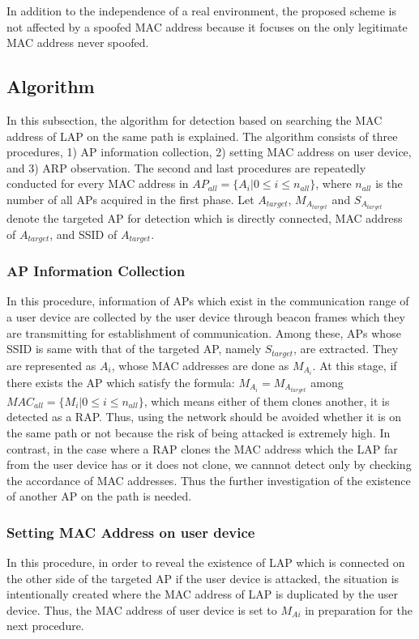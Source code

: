 \documentclass[conference]{IEEEtran}
\begin{document}
In addition to the independence of a real environment, the proposed scheme is not affected by a spoofed MAC address because it focuses on the only legitimate MAC address never spoofed.

\subsection{Algorithm}
In this subsection, the algorithm for detection based on searching the MAC address of LAP on the same path is explained.
The algorithm consists of three procedures, 1) AP information collection, 2) setting MAC address on user device, and 3) ARP observation.
The second and last procedures are repeatedly conducted for every MAC address in  $AP_{all}=\{A_i|0\le i \le n_{all}\}$, where $n_{all}$ is the number of all APs acquired in the first   phase.
Let $A_{target}$, $M_{A_{target}}$ and $S_{A_{target}}$ denote the targeted AP for detection which is directly connected, MAC address of $A_{target}$, and SSID of $A_{target}$.

\subsubsection{AP Information Collection}
In this procedure, information of APs which exist in the communication range of a user device are collected by the user device through beacon frames which they are transmitting for establishment of communication.
Among these, APs whose SSID is same with that of the targeted AP, namely $S_{target}$, are extracted.
They are represented as $A_i$, whose MAC addresses are done as $M_{A_i}$.
At this stage, if there exists the AP which satisfy the formula: $M_{A_i} = M_{A_{target}}$  among $MAC_{all}=\{M_i|0 \le i \le n_{all}\}$, which means either of them clones another, it is detected as a RAP.
Thus, using the network should be avoided whether it is on the same path or not because the risk of being attacked is extremely high. 
In contrast, in the case where a RAP clones the MAC address which the LAP far from the user device has or it does not clone, we cannnot detect only by checking the accordance of MAC addresses.
Thus the further investigation of the existence of another AP on the path is needed.

\subsubsection{Setting MAC Address on user device}
In this procedure, in order to reveal the existence of LAP which is connected on the other side of the targeted AP if  the user device is attacked, the situation is intentionally created where the MAC address of LAP is duplicated by the user device.
Thus, the MAC address of user device is set to $M_{Ai}$ in preparation for the next procedure.
\end{document}
